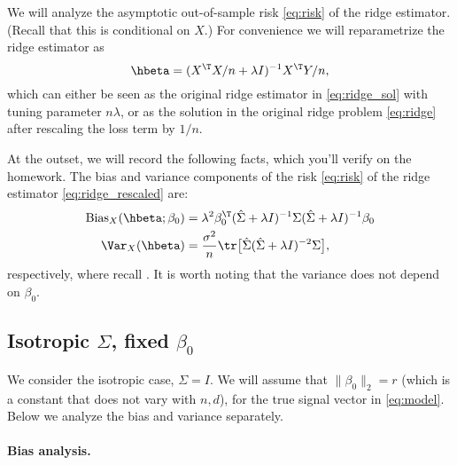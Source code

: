 \documentclass{article}
\begin{document}
We will analyze the asymptotic out-of-sample risk \eqref{eq:risk} of the ridge
estimator. (Recall that this is conditional on $X$.) For convenience we will
reparametrize the ridge estimator as    
\begin{equation}
\label{eq:ridge_rescaled}
\hbeta = (X^\T X/n + \lambda I)^{-1} X^\T Y/n,
\end{equation}
which can either be seen as the original ridge estimator in \eqref{eq:ridge_sol} 
with tuning parameter $n\lambda$, or as the solution in the original ridge
problem \eqref{eq:ridge} after rescaling the loss term by $1/n$.  

At the outset, we will record the following facts, which you'll verify on the
homework. The bias and variance components of the risk \eqref{eq:risk} of the
ridge estimator \eqref{eq:ridge_rescaled} are:     
\begin{align}
\label{eq:ridge_bias}
\Bias_X(\hbeta; \beta_0) &= \lambda^2 \beta_0^\T (\hSigma + \lambda I)^{-1}
  \Sigma (\hSigma + \lambda I)^{-1} \beta_0 \\ 
\label{eq:ridge_var}
\Var_X(\hbeta) &= \frac{\sigma^2}{n} \tr \big[ \hSigma ( \hSigma + \lambda
  I)^{-2} \Sigma \big],
\end{align}
respectively, where recall . It is worth noting that
the variance does not depend on $\beta_0$. 

\subsection{Isotropic $\Sigma$, fixed $\beta_0$}

We consider the isotropic case, $\Sigma = I$. We will assume that $\|\beta_0\|_2
= r$ (which is a constant that does not vary with $n,d$), for the true signal
vector in \eqref{eq:model}. Below we analyze the bias and variance separately. 

\paragraph{Bias analysis.}
\end{document}
